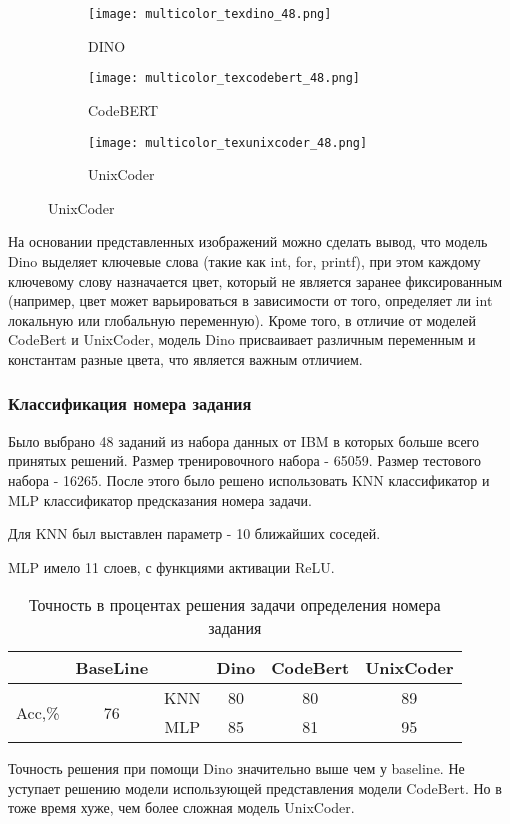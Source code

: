 \documentclass[../part_3.tex]{subfiles}
\begin{document}
\begin{figure}[H]
	\centering
	\begin{subfigure}{.32\textwidth}
		\centering
		\texttt{[image: multicolor\_texdino\_48.png]}
		\caption{DINO}
	\end{subfigure}
	\hfill
	\begin{subfigure}{.32\textwidth}
		\centering
		\texttt{[image: multicolor\_texcodebert\_48.png]}
		\caption{CodeBERT}
	\end{subfigure}
	\hfill
	\begin{subfigure}{.32\textwidth}
		\centering
		\texttt{[image: multicolor\_texunixcoder\_48.png]}
		\caption{UnixCoder}
	\end{subfigure}
	\vspace{1cm}
\end{figure}
\par На основании представленных изображений можно сделать вывод, что модель Dino выделяет ключевые слова (такие как int, for, printf), при этом каждому ключевому слову назначается цвет, который не является заранее фиксированным (например, цвет может варьироваться в зависимости от того, определяет ли int локальную или глобальную переменную). Кроме того, в отличие от моделей CodeBert и UnixCoder, модель Dino присваивает различным переменным и константам разные цвета, что является важным отличием.
\subsubsection{Классификация номера задания}
\par Было выбрано 48 заданий из набора данных от IBM в которых больше всего принятых решений. Размер тренировочного набора - 65059. Размер тестового набора - 16265. После этого было решено использовать KNN классификатор и MLP классификатор предсказания номера задачи.
\par Для KNN был выставлен параметр - 10 ближайших соседей.
\par MLP имело 11 слоев, с функциями активации ReLU.
\begin{table}[H]
	\centering
	\begin{tabular}{|c|c||c|c|c|c|}\hline
		                        & BaseLine            &     & Dino & CodeBert & UnixCoder \\ \hline
		\multirow{2}{*}{Acc,\%} & \multirow{2}{*}{76} & KNN & 80      & 80       & 89        \\\cline{3-6}
		                        &                     & MLP & 85      & 81       & 95        \\\hline
	\end{tabular}
	\caption{Точность в процентах решения задачи определения номера задания}
\end{table}
\par Точность решения при помощи Dino значительно выше чем у baseline. Не уступает решению модели использующей представления модели CodeBert. Но в тоже время хуже, чем более сложная модель UnixCoder.
\end{document}
